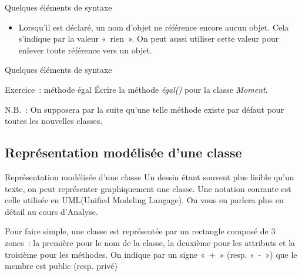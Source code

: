 \begin{frame}{Quelques éléments de syntaxe}
	\begin{itemize}
		\item 
			Lorsqu'il est déclaré, un nom d'objet
			ne référence encore aucun objet. Cela s'indique par la
			valeur «~rien~». On peut aussi utiliser cette valeur pour enlever toute
			référence vers un objet.
	\end{itemize}
\end{frame}

\begin{frame}{Quelques éléments de syntaxe}
\end{frame}

\begin{frame}{Exercice~: méthode égal}
		Écrire la méthode \textit{égal()} pour la classe \textit{Moment}.
		
		N.B.~: On supposera par la suite qu'une telle méthode
		existe par défaut pour toutes les nouvelles classes.
\end{frame}

\subsection{Représentation modélisée d'une classe}

\begin{frame}{Représentation modélisée d'une classe}
	Un dessin étant souvent plus lisible qu'un texte, on
	peut représenter graphiquement une classe. Une notation courante est
	celle utilisée en UML(Unified
	Modeling Langage). On vous en parlera plus en détail au cours
	d'Analyse. 
	
	\bigskip
	
	Pour faire simple, une classe est
	représentée par un rectangle composé de 3 zones~: la première pour le
	nom de la classe, la deuxième pour les attributs et la troisième pour
	les méthodes. On indique par un signe «~+~» (resp. «~-~») que le membre
	est public (resp. privé)
\end{frame}

